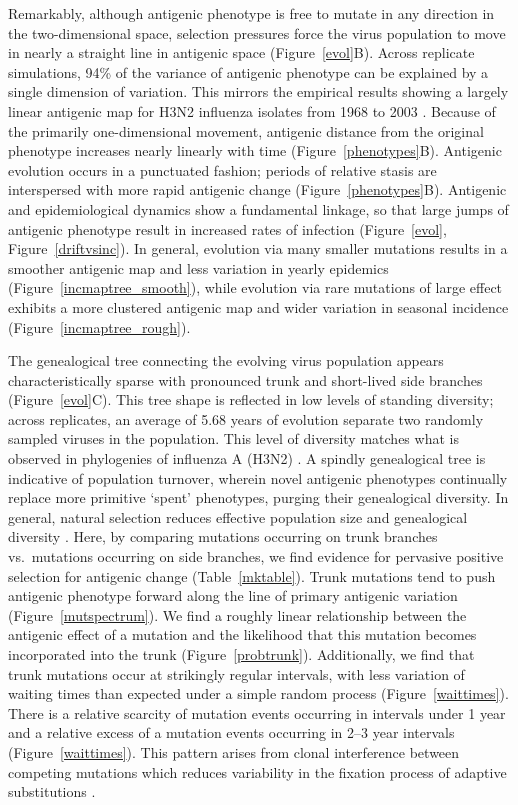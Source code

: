 \documentclass[11pt,oneside,letterpaper]{article}
\begin{document}
Remarkably, although antigenic phenotype is free to mutate in any direction in the two-dimensional space, selection pressures force the virus population to move in nearly a straight line in antigenic space (Figure~\ref{evol}B).  Across replicate simulations, 94\% of the variance of antigenic phenotype can be explained by a single dimension of variation.  This mirrors the empirical results showing a largely linear antigenic map for H3N2 influenza isolates from 1968 to 2003 \cite{Smith04}.  Because of the primarily one-dimensional movement, antigenic distance from the original phenotype increases nearly linearly with time (Figure~\ref{phenotypes}B).  Antigenic evolution occurs in a punctuated fashion; periods of relative stasis are interspersed with more rapid antigenic change (Figure~\ref{phenotypes}B).  Antigenic and epidemiological dynamics show a fundamental linkage, so that large jumps of antigenic phenotype result in increased rates of infection (Figure~\ref{evol}, Figure~\ref{driftvsinc}).  In general, evolution via many smaller mutations results in a smoother antigenic map and less variation in yearly epidemics (Figure~\ref{incmaptree_smooth}), while evolution via rare mutations of large effect exhibits a more clustered antigenic map and wider variation in seasonal incidence (Figure~\ref{incmaptree_rough}).

The genealogical tree connecting the evolving virus population appears characteristically sparse with pronounced trunk and short-lived side branches  (Figure~\ref{evol}C).  This tree shape is reflected in low levels of standing diversity; across replicates, an average of 5.68 years of evolution separate two randomly sampled viruses in the population.  This level of diversity matches what is observed in phylogenies of influenza A (H3N2) \cite{Rambaut08}.  A spindly genealogical tree is indicative of population turnover, wherein novel antigenic phenotypes continually replace more primitive `spent' phenotypes, purging their genealogical diversity.  In general, natural selection reduces effective population size and genealogical diversity \cite{BedfordBMC11}.  Here, by comparing mutations occurring on trunk branches vs.\ mutations occurring on side branches, we find evidence for pervasive positive selection for antigenic change (Table~\ref{mktable}).  Trunk mutations tend to push antigenic phenotype forward along the line of primary antigenic variation (Figure~\ref{mutspectrum}).  We find a roughly linear relationship between the antigenic effect of a mutation and the likelihood that this mutation becomes incorporated into the trunk (Figure~\ref{probtrunk}).  Additionally, we find that trunk mutations occur at strikingly regular intervals, with less variation of waiting times than expected under a simple random process (Figure~\ref{waittimes}).  There is a relative scarcity of mutation events occurring in intervals under 1 year and a relative excess of a mutation events occurring in 2--3 year intervals (Figure~\ref{waittimes}).  This pattern arises from clonal interference between competing mutations which reduces variability in the fixation process of adaptive substitutions \cite{Park07}.
\end{document}
